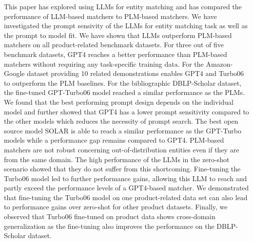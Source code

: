 \documentclass[sigconf,nonacm]{acmart}
\begin{document}
This paper has explored using LLMs for entity matching and has compared the performance of LLM-based matchers to PLM-based matchers. We have investigated the prompt sensivity of the LLMs for entity matching task as well as the prompt to model fit.
We have shown that LLMs outperform PLM-based matchers on all product-related benchmark datasets. For three out of five benchmark datasets, GPT4 reaches a better performance than PLM-based matchers without requiring any task-specific training data. For the Amazon-Google dataset providing 10 related demonstrations enables GPT4 and Turbo06 to outperform the PLM baselines. For the bibliographic DBLP-Scholar dataset, the fine-tuned GPT-Turbo06 model reached a similar performance as the PLMs. 
We found that the best performing prompt design depends on the individual model and further showed that GPT4 has a lower prompt sensitivity compared to the other models which reduces the necessity of prompt search.
The best open source model SOLAR is able to reach a similar performance as the GPT-Turbo models while a performance gap remains compared to GPT4. PLM-based matchers are not robust concerning out-of-distribution entities even if they are from the same domain. The high performance of the LLMs in the zero-shot scenario showed that they do not suffer from this shortcoming. Fine-tuning the Turbo06 model led to further performance gains, allowing this LLM to reach and partly exceed the performance levels of a GPT4-based matcher. We demonstrated that fine-tuning the Turbo06 model on one product-related data set can also lead to performance gains over zero-shot for other product datasets. Finally, we observed that Turbo06 fine-tuned on product data shows cross-domain generalization as the fine-tuning also improves the performance on the DBLP-Scholar dataset. 


\balance





\end{document}
